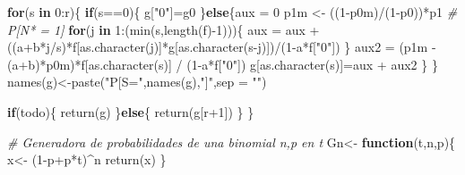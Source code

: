 \documentclass[
]{article}
\newenvironment{Shaded}{\begin{snugshade}}{\end{snugshade}}
\newcommand{\AttributeTok}[1]{\textcolor[rgb]{0.77,0.63,0.00}{#1}}
\newcommand{\CommentTok}[1]{\textcolor[rgb]{0.56,0.35,0.01}{\textit{#1}}}
\newcommand{\ControlFlowTok}[1]{\textcolor[rgb]{0.13,0.29,0.53}{\textbf{#1}}}
\newcommand{\DecValTok}[1]{\textcolor[rgb]{0.00,0.00,0.81}{#1}}
\newcommand{\FunctionTok}[1]{\textcolor[rgb]{0.00,0.00,0.00}{#1}}
\newcommand{\NormalTok}[1]{#1}
\newcommand{\OtherTok}[1]{\textcolor[rgb]{0.56,0.35,0.01}{#1}}
\newcommand{\SpecialCharTok}[1]{\textcolor[rgb]{0.00,0.00,0.00}{#1}}
\newcommand{\StringTok}[1]{\textcolor[rgb]{0.31,0.60,0.02}{#1}}
\begin{document}
\begin{Shaded}
\begin{Highlighting}[]
  \ControlFlowTok{for}\NormalTok{(s }\ControlFlowTok{in} \DecValTok{0}\SpecialCharTok{:}\NormalTok{r)\{}
    \ControlFlowTok{if}\NormalTok{(s}\SpecialCharTok{==}\DecValTok{0}\NormalTok{)\{}
\NormalTok{      g[}\StringTok{"0"}\NormalTok{]}\OtherTok{=}\NormalTok{g0}
\NormalTok{    \}}\ControlFlowTok{else}\NormalTok{\{aux }\OtherTok{=} \DecValTok{0}
\NormalTok{    p1m }\OtherTok{\textless{}{-}}\NormalTok{ ((}\DecValTok{1}\SpecialCharTok{{-}}\NormalTok{p0m)}\SpecialCharTok{/}\NormalTok{(}\DecValTok{1}\SpecialCharTok{{-}}\NormalTok{p0))}\SpecialCharTok{*}\NormalTok{p1 }\CommentTok{\# P[N* = 1]}
    \ControlFlowTok{for}\NormalTok{(j }\ControlFlowTok{in} \DecValTok{1}\SpecialCharTok{:}\NormalTok{(}\FunctionTok{min}\NormalTok{(s,}\FunctionTok{length}\NormalTok{(f)}\SpecialCharTok{{-}}\DecValTok{1}\NormalTok{)))\{}
\NormalTok{      aux }\OtherTok{=}\NormalTok{ aux }\SpecialCharTok{+}\NormalTok{ ((a}\SpecialCharTok{+}\NormalTok{b}\SpecialCharTok{*}\NormalTok{j}\SpecialCharTok{/}\NormalTok{s)}\SpecialCharTok{*}\NormalTok{f[}\FunctionTok{as.character}\NormalTok{(j)]}\SpecialCharTok{*}\NormalTok{g[}\FunctionTok{as.character}\NormalTok{(s}\SpecialCharTok{{-}}\NormalTok{j)])}\SpecialCharTok{/}\NormalTok{(}\DecValTok{1}\SpecialCharTok{{-}}\NormalTok{a}\SpecialCharTok{*}\NormalTok{f[}\StringTok{"0"}\NormalTok{])}
\NormalTok{    \}}
\NormalTok{    aux2 }\OtherTok{=}\NormalTok{ (p1m }\SpecialCharTok{{-}}\NormalTok{ (a}\SpecialCharTok{+}\NormalTok{b)}\SpecialCharTok{*}\NormalTok{p0m)}\SpecialCharTok{*}\NormalTok{f[}\FunctionTok{as.character}\NormalTok{(s)] }\SpecialCharTok{/}\NormalTok{ (}\DecValTok{1}\SpecialCharTok{{-}}\NormalTok{a}\SpecialCharTok{*}\NormalTok{f[}\StringTok{"0"}\NormalTok{])}
\NormalTok{    g[}\FunctionTok{as.character}\NormalTok{(s)]}\OtherTok{=}\NormalTok{aux }\SpecialCharTok{+}\NormalTok{ aux2}
\NormalTok{    \}}
\NormalTok{  \}}
  \FunctionTok{names}\NormalTok{(g)}\OtherTok{\textless{}{-}}\FunctionTok{paste}\NormalTok{(}\StringTok{"P[S="}\NormalTok{,}\FunctionTok{names}\NormalTok{(g),}\StringTok{"]"}\NormalTok{,}\AttributeTok{sep =} \StringTok{""}\NormalTok{)}
  
  \ControlFlowTok{if}\NormalTok{(todo)\{}
    \FunctionTok{return}\NormalTok{(g)}
\NormalTok{  \}}\ControlFlowTok{else}\NormalTok{\{}
    \FunctionTok{return}\NormalTok{(g[r}\SpecialCharTok{+}\DecValTok{1}\NormalTok{])}
\NormalTok{  \}}
\NormalTok{\}}

\CommentTok{\# Generadora de probabilidades de una binomial n,p en t}
\NormalTok{Gn}\OtherTok{\textless{}{-}} \ControlFlowTok{function}\NormalTok{(t,n,p)\{}
\NormalTok{  x}\OtherTok{\textless{}{-}}\NormalTok{ (}\DecValTok{1}\SpecialCharTok{{-}}\NormalTok{p}\SpecialCharTok{+}\NormalTok{p}\SpecialCharTok{*}\NormalTok{t)}\SpecialCharTok{\^{}}\NormalTok{n}
  \FunctionTok{return}\NormalTok{(x)}
\NormalTok{\}}
\end{Highlighting}
\end{Shaded}
\end{document}
